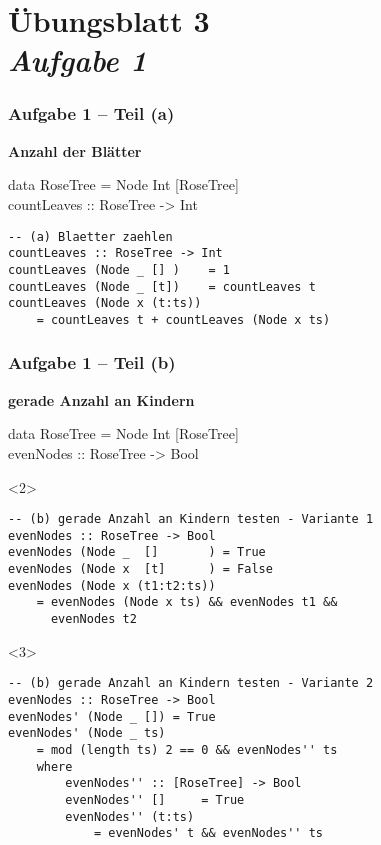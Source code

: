 \documentclass{beamer}
\begin{document}
\section{Übungsblatt 3 \\ \textit{\normalsize Aufgabe 1}}

\begin{frame}[t, fragile] \frametitle{Aufgabe 1 -- Teil (a)}
	\textbf{Anzahl der Blätter}
	
	\begin{ttfamily}
		data RoseTree = Node Int [RoseTree] \\
		countLeaves :: RoseTree -> Int
	\end{ttfamily}
	
	
	\pause \bigskip
	
	\begin{lstlisting}
-- (a) Blaetter zaehlen
countLeaves :: RoseTree -> Int
countLeaves (Node _ [] )    = 1
countLeaves (Node _ [t])    = countLeaves t
countLeaves (Node x (t:ts)) 
	= countLeaves t + countLeaves (Node x ts)
	\end{lstlisting}
\end{frame}

\begin{frame}[t, fragile] \frametitle{Aufgabe 1 -- Teil (b)}
	\textbf{gerade Anzahl an Kindern}
	
	\begin{ttfamily}
		data RoseTree = Node Int [RoseTree] \\
		evenNodes :: RoseTree -> Bool
	\end{ttfamily}
	
	
	\pause \bigskip
	\begin{onlyenv}
		\begin{lstlisting}
-- (b) gerade Anzahl an Kindern testen - Variante 1
evenNodes :: RoseTree -> Bool
evenNodes (Node _  []       ) = True
evenNodes (Node x  [t]      ) = False
evenNodes (Node x (t1:t2:ts)) 
	= evenNodes (Node x ts) && evenNodes t1 && 
	  evenNodes t2
		\end{lstlisting}
	\end{onlyenv}

	\begin{onlyenv}
		\begin{lstlisting}
-- (b) gerade Anzahl an Kindern testen - Variante 2
evenNodes :: RoseTree -> Bool
evenNodes' (Node _ []) = True
evenNodes' (Node _ ts)
	= mod (length ts) 2 == 0 && evenNodes'' ts
	where
		evenNodes'' :: [RoseTree] -> Bool
		evenNodes'' []     = True
		evenNodes'' (t:ts) 
			= evenNodes' t && evenNodes'' ts
		\end{lstlisting}
	\end{onlyenv}
\end{frame}
\end{document}
